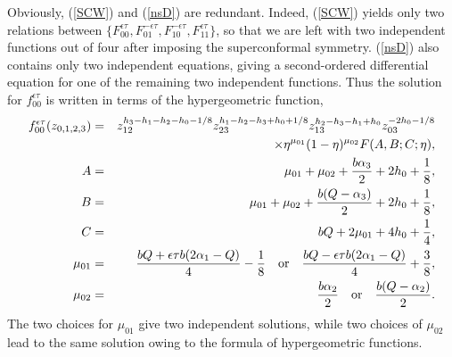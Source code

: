 \documentclass[a4paper,12pt]{article}
\newcommand{\ep}{{\epsilon}}
\begin{document}
   Obviously, (\ref{SCW}) and (\ref{nsD}) are redundant.
 Indeed, (\ref{SCW}) yields only two relations between
 $\{F_{00}^{\ep\tau},F_{01}^{-\ep\tau},
    F_{10}^{-\ep\tau},F_{11}^{\ep\tau}\}$, so that we are left with
 two independent functions out of four after imposing
 the superconformal symmetry.
 (\ref{nsD}) also contains only two independent equations,
 giving a second-ordered differential equation for
 one of the remaining two independent functions.
 Thus the solution for $f_{00}^{\ep\tau}$
 is written in terms of the hypergeometric function,
\begin{eqnarray}
  f_{00}^{\ep\tau}(z_{0,1,2,3})
&=&z_{12}^{h_3-h_1-h_2-h_0-1/8}
   z_{23}^{h_1-h_2-h_3+h_0+1/8}
   z_{13}^{h_2-h_3-h_1+h_0}
   z_{03}^{-2h_0-1/8}
 \nonumber \\ && \times
   \eta^{\mu_{01}}(1-\eta)^{\mu_{02}}F(A,B;C;\eta),
 \nonumber \\
  A &=& \mu_{01}+\mu_{02}+\frac{b\alpha_3}{2}+2h_0+\frac{1}{8},
 \nonumber \\
  B &=& \mu_{01}+\mu_{02}+\frac{b(Q-\alpha_3)}{2}+2h_0+\frac{1}{8},
 \nonumber \\
  C &=& bQ+2\mu_{01}+4h_{0}+\frac{1}{4},
 \nonumber \\
  \mu_{01} &=& \frac{bQ+\ep\tau b(2\alpha_1-Q)}{4}-\frac{1}{8} ~~~{\rm or}~~~
               \frac{bQ-\ep\tau b(2\alpha_1-Q)}{4}+\frac{3}{8},
 \nonumber \\
  \mu_{02} &=& \frac{b\alpha_2}{2} ~~~{\rm or}~~~ \frac{b(Q-\alpha_2)}{2}.
\end{eqnarray}
 The two choices for $\mu_{01}$ give two independent solutions,
 while two choices of $\mu_{02}$ lead to the same solution owing
 to the formula of hypergeometric functions.

~
\end{document}
